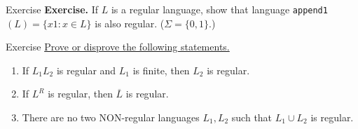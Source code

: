 \documentclass[10pt]{beamer}
\begin{document}
\begin{frame}[t]{Exercise}
    \textbf{Exercise.} If $L$ is a regular language, show that language \texttt{append1}$(L) = \{ x1 : x \in L \}$ is also regular. ($\Sigma = \{0,1\}$.)
\end{frame}

\begin{frame}{Exercise}
    \underline{Prove or disprove the following statements.}
    \begin{enumerate}
        \item If $L_1L_2$ is regular and $L_1$ is finite, then $L_2$ is regular.
        \item If $L^R$ is regular, then $\overline{L}$ is regular.
        \item There are no two NON-regular languages $L_1,L_2$ such that $L_1 \cup L_2$ is regular.
    \end{enumerate}
\end{frame}
\end{document}
